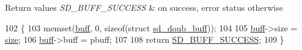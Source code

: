 \begin{DoxyRetVals}{Return values}
{\em S\+D\+\_\+\+B\+U\+F\+F\+\_\+\+S\+U\+C\+C\+E\+SS} & on success, error status otherwise \\
\hline
\end{DoxyRetVals}

\begin{DoxyCode}
102 \{
103     memset(\mbox{\hyperlink{structsd__cbuf_a8b212742c92a124f2eb4a244acc19f7c}{buff}}, 0, \textcolor{keyword}{sizeof}(\textcolor{keyword}{struct} \mbox{\hyperlink{structsd__doub__buff}{sd\_doub\_buff}}));
104     
105     \mbox{\hyperlink{structsd__cbuf_a8b212742c92a124f2eb4a244acc19f7c}{buff}}->size = \mbox{\hyperlink{structsd__cbuf_ab2c6b258f02add8fdf4cfc7c371dd772}{size}};
106     \mbox{\hyperlink{structsd__cbuf_a8b212742c92a124f2eb4a244acc19f7c}{buff}}->buff = pbuff;
107 
108     \textcolor{keywordflow}{return} \mbox{\hyperlink{group___s_d___buffer___types_gga012d8a07d989f00e3f9c4a2f62743de4a57815778d30aaa889a6e73dfc081e5f6}{SD\_BUFF\_SUCCESS}};
109 \}
\end{DoxyCode}
